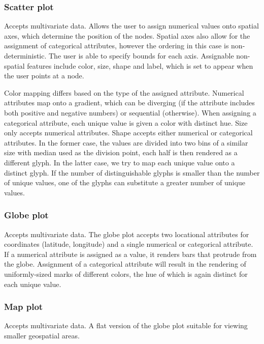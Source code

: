 \documentclass[thesis=M,english,hidelinks]{FITthesisXE}[2012/06/26]
\begin{document}
\subsubsection{Scatter plot}

Accepts multivariate data. Allows the user to assign numerical values onto spatial axes, which determine the position of the nodes. Spatial axes also allow for the assignment of categorical attributes, however the ordering in this case is non-deterministic. The user is able to specify bounds for each axis. Assignable non-spatial features include color, size, shape and label, which is set to appear when the user points at a node.

Color mapping differs based on the type of the assigned attribute. Numerical attributes map onto a gradient, which can be diverging (if the attribute includes both positive and negative numbers) or sequential (otherwise). When assigning a categorical attribute, each unique value is given a color with distinct hue. Size only accepts numerical attributes. Shape accepts either numerical or categorical attributes. In the former case, the values are divided into two bins of a similar size with median used as the division point, each half is then rendered as a different glyph. In the latter case, we try to map each unique value onto a distinct glyph. If the number of distinguishable glyphs is smaller than the number of unique values, one of the glyphs can substitute a greater number of unique values.

\subsubsection{Globe plot}

Accepts multivariate data. The globe plot accepts two locational attributes for coordinates (latitude, longitude) and a single numerical or categorical attribute. If a numerical attribute is assigned as a value, it renders bars that protrude from the globe. Assignment of a categorical attribute will result in the rendering of uniformly-sized marks of different colors, the hue of which is again distinct for each unique value.

\subsubsection{Map plot}

Accepts multivariate data. A flat version of the globe plot suitable for viewing smaller geospatial areas.
\end{document}
